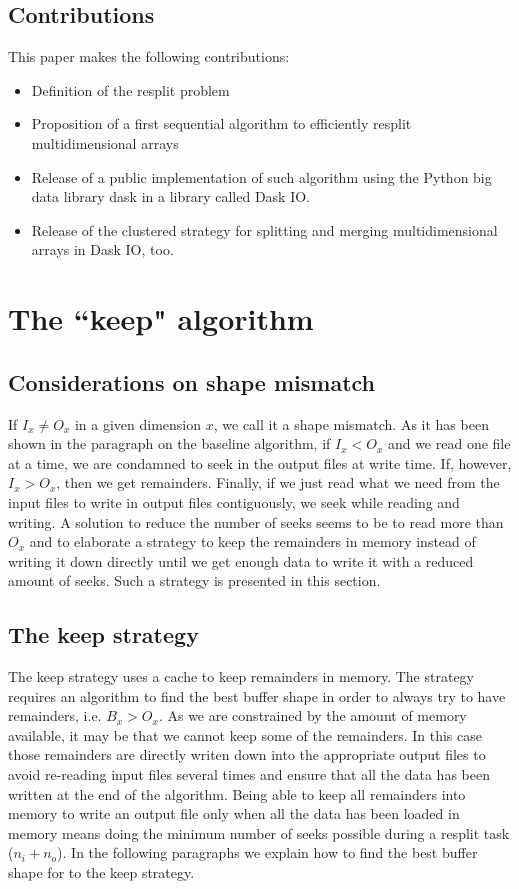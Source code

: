 \documentclass[conference]{IEEEtran}
\begin{document}
\subsection{Contributions}
This paper makes the following contributions:
\begin{itemize}
  \item Definition of the resplit problem
  \item Proposition of a first sequential algorithm to efficiently resplit
  multidimensional arrays
  \item Release of a public implementation of such algorithm using the Python
  big data library dask in a library called Dask IO.
  \item Release of the clustered strategy for splitting and merging
  multidimensional arrays in Dask IO, too.
\end{itemize}

\section{The ``keep" algorithm}

\subsection{Considerations on shape mismatch}
If $I_x \neq O_x$ in a given dimension $x$, we call it a shape mismatch. As it
has been shown in the paragraph on the baseline algorithm, if $I_x < O_x$ and
we read one file at a time, we are condamned to seek in the output files at
write time. If, however, $I_x > O_x$, then we get remainders. Finally, if we
just read what we need from the input files to write in output files
contiguously, we seek while reading and writing. A solution to reduce the
number of seeks seems to be to read more than $O_x$ and to elaborate a strategy
to keep the remainders in memory instead of writing it down directly until we
get enough data to write it with a reduced amount of seeks. Such a strategy is
presented in this section.

\subsection{The keep strategy}
The keep strategy uses a cache to keep remainders in memory.
The strategy requires an algorithm to find the best buffer shape in order to
always try to have remainders, i.e. $B_x>O_x$. As we are constrained by the
amount of memory available, it may be that we cannot keep some of the remainders.
In this case those remainders are directly writen down into the appropriate
output files to avoid re-reading input files several times and ensure that all
the data has been written at the end of the algorithm. Being able to keep all
remainders into memory to write an output file only when all the data has been
loaded in memory means doing the minimum number of seeks possible during a
resplit task ($n_i + n_o$). In the following paragraphs we explain how to find
the best buffer shape for to the keep strategy.
\end{document}
